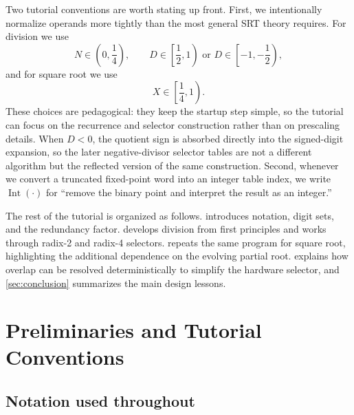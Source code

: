 \documentclass[11pt]{article}
\DeclareMathOperator{\Int}{Int}
\numberwithin{equation}{section}
\begin{document}
Two tutorial conventions are worth stating up front.
First, we intentionally normalize operands more tightly than the most general SRT theory requires.
For division we use
\[
  N \in \left(0,\frac{1}{4}\right),
  \qquad
  D \in \left[\frac{1}{2},1\right)
  \text{ or }
  D \in \left[-1,-\frac{1}{2}\right),
\]
and for square root we use
\[
  X \in \left[\frac{1}{4},1\right).
\]
These choices are pedagogical: they keep the startup step simple, so the tutorial can focus on the
recurrence and selector construction rather than on prescaling details.
When $D<0$, the quotient sign is absorbed directly into the signed-digit expansion, so the later
negative-divisor selector tables are not a different algorithm but the reflected version of the
same construction.
Second, whenever we convert a truncated fixed-point word into an integer table index, we write
$\Int(\cdot)$ for ``remove the binary point and interpret the result as an integer.''

The rest of the tutorial is organized as follows.
 introduces notation, digit sets, and the redundancy factor.
 develops division from first principles and works through radix-2 and radix-4
selectors.
 repeats the same program for square root, highlighting the additional dependence on
the evolving partial root.
 explains how overlap can be resolved deterministically to simplify the
hardware selector, and \cref{sec:conclusion} summarizes the main design lessons.

\clearpage

\section{Preliminaries and Tutorial Conventions}
\label{sec:preliminaries}

\subsection{Notation used throughout}
\end{document}
